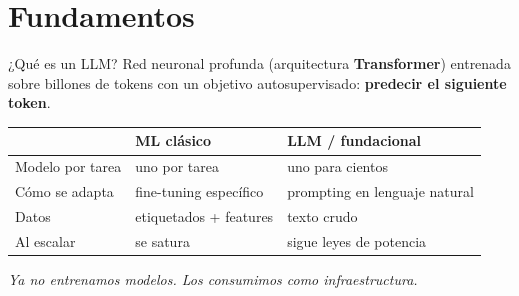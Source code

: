 \documentclass[aspectratio=169,11pt]{beamer}
\newcommand{\hl}[1]{\textcolor{mBlue}{\textbf{#1}}}
\begin{document}
\section{Fundamentos}

\begin{frame}{¿Qué es un LLM?}
  \small
  Red neuronal profunda (arquitectura \hl{Transformer}) entrenada sobre billones de tokens con un objetivo autosupervisado: \textbf{predecir el siguiente token}.

  \vspace{0.4cm}
  \begin{center}
  \renewcommand{\arraystretch}{1.2}
  \begin{tabular}{@{}p{4.2cm} p{4.5cm} p{4.5cm}@{}}
    \toprule
     & \textbf{ML clásico} & \textbf{LLM / fundacional} \\
    \midrule
    Modelo por tarea & uno por tarea & uno para cientos \\
    Cómo se adapta & fine-tuning específico & prompting en lenguaje natural \\
    Datos & etiquetados + features & texto crudo \\
    Al escalar & se satura & sigue leyes de potencia \\
    \bottomrule
  \end{tabular}
  \end{center}

  \vspace{0.3cm}
  \begin{center}
    \textcolor{mBlue}{\textit{Ya no entrenamos modelos. Los consumimos como infraestructura.}}
  \end{center}
\end{frame}
\end{document}
